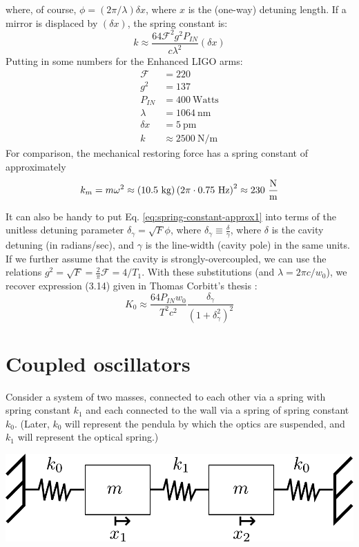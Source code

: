 where, of course, $\phi=(2\pi/\lambda)\delta x$, where $x$ is the
(one-way) detuning length. If a mirror is displaced by $(\delta x)$,
the spring constant is:
\[
k\approx\frac{64\mathcal{F}^{2}g^{2}P_{IN}}{c\lambda^{2}}\left(\delta x\right)
\]
Putting in some numbers for the Enhanced LIGO arms:
\begin{align*}
\mathcal{F} & =220\\
g^{2} & =137\\
P_{IN} & =400\mathrm{\ Watts}\\
\lambda & =1064\mathrm{\ nm}\\
\delta x & =5\mathrm{\ pm}\\
\hline k & \approx2500\mathrm{\ N/m}
\end{align*}
For comparison, the mechanical restoring force has a spring constant
of approximately
\[
k_{m}=m\omega^{2}\approx\left(10.5\text{ kg}\right)\left(2\pi\cdot0.7\text{5 Hz}\right)^{2}\approx230\text{ \ensuremath{\frac{\text{N}}{\text{m}}}}
\]


It can also be handy to put Eq. \ref{eq:spring-constant-approx1}
into terms of the unitless detuning parameter $\delta_{\gamma}=\sqrt{F}\phi$,
where $\delta_{\gamma}\equiv\frac{\delta}{\gamma}$, where $\delta$
is the cavity detuning (in radians/sec), and $\gamma$ is the line-width
(cavity pole) in the same units. If we further assume that the cavity
is strongly-overcoupled, we can use the relations $g^{2}=\sqrt{F}=\frac{2}{\pi}\mathcal{F}=4/T_{1}$.
With these substitutions (and $\lambda=2\pi c/w_{0}$), we recover
expression (3.14) given in Thomas Corbitt's thesis \cite{Corbitt2008Quantum}:
\begin{equation}
K_{0}\approx\frac{64P_{IN}w_{0}}{T^{2}c^{2}}\frac{\delta_{\gamma}}{\left(1+\delta_{\gamma}^{2}\right)^{2}}
\end{equation}


\section*{Coupled oscillators}

Consider a system of two masses, connected to each other via a spring
with spring constant $k_{1}$ and each connected to the wall via a
spring of spring constant $k_{0}$. (Later, $k_{0}$ will represent
the pendula by which the optics are suspended, and $k_{1}$ will represent
the optical spring.)

\begin{center}
\includegraphics[width=0.4\paperwidth]{figures/coupled-oscillators-diagram}
\par\end{center}


